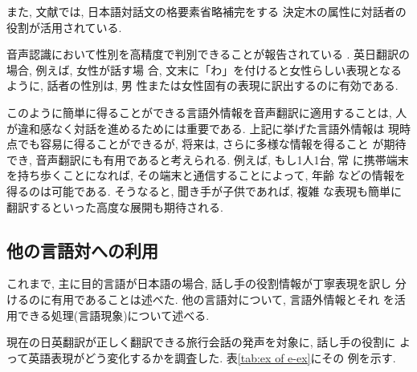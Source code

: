 また, 文献\cite{Yamamoto:1999}では, 日本語対話文の格要素省略補完をする
決定木の属性に対話者の役割が活用されている. 

\vspace{5mm}

\hspace{-4mm}{\bf 対話者の性別}

音声認識において性別を高精度で判別できることが報告されている
\cite{Takezawa:1998,Naito:1998}. 英日翻訳の場合, 例えば, 女性が話す場
合, 文末に「わ」を付けると女性らしい表現となるように, 話者の性別は, 男
性または女性固有の表現に訳出するのに有効である. 

\vspace{5mm}

このように簡単に得ることができる言語外情報を音声翻訳に適用することは, 
人が違和感なく対話を進めるためには重要である. 上記に挙げた言語外情報は
現時点でも容易に得ることができるが, 将来は, さらに多様な情報を得ること
が期待でき, 音声翻訳にも有用であると考えられる. 例えば, もし1人1台, 常
に携帯端末を持ち歩くことになれば, その端末と通信することによって, 年齢
などの情報を得るのは可能である. そうなると, 聞き手が子供であれば, 複雑
な表現も簡単に翻訳するといった高度な展開も期待される. 


\subsection{他の言語対への利用}

これまで, 主に目的言語が日本語の場合, 話し手の役割情報が丁寧表現を訳し
分けるのに有用であることは述べた. 他の言語対について, 言語外情報とそれ
を活用できる処理(言語現象)について述べる. 

\hspace{-4mm}{\bf 日英}

現在の日英翻訳が正しく翻訳できる旅行会話の発声を対象に, 話し手の役割に
よって英語表現がどう変化するかを調査した. 表\ref{tab:ex of e-ex}にその
例を示す. 

